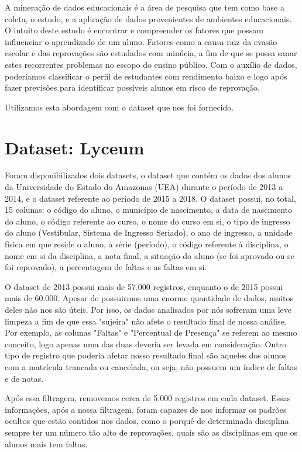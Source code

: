 \documentclass[12pt]{article}
\begin{document}
A mineração de dados educacionais é a área de pesquisa que tem como base a coleta, o estudo, e a aplicação de dados provenientes de ambientes educacionais. \cite{Minera:01}\cite{Lucas:17} O intuito deste estudo é encontrar e compreender os fatores que possam influenciar o aprendizado de um aluno. Fatores como a causa-raiz da evasão escolar e das reprovações são estudados com minúcia, a fim de que se possa sanar estes recorrentes problemas no escopo do ensino público. Com o auxílio de dados, poderíamos classificar o perfil de estudantes com rendimento baixo e logo após fazer previsões para identificar possíveis alunos em risco de reprovação.

Utilizamos esta abordagem com o dataset que nos foi fornecido.

\section{Dataset: Lyceum}
Foram disponibilizados dois datasets, o dataset que contém os dados dos alunos da Universidade do Estado do Amazonas (UEA) durante o período de 2013 a 2014, e o dataset referente ao período de 2015 a 2018. O dataset possui, no total, 15 colunas: o código do aluno, o município de nascimento, a data de nascimento do aluno, o código referente ao curso, o nome do curso em si, o tipo de ingresso do aluno (Vestibular, Sistema de Ingresso Seriado), o ano de ingresso, a unidade física em que reside o aluno, a série (período), o código referente à disciplina, o nome em si da disciplina, a nota final, a situação do aluno (se foi aprovado ou se foi reprovado), a percentagem de faltas e as faltas em si.

O dataset de 2013 possui mais de 57.000 registros, enquanto o de 2015 possui mais de 60.000. Apesar de possuirmos uma enorme quantidade de dados, muitos deles não nos são úteis. Por isso, os dados analisados por nós sofreram uma leve limpeza a fim de que essa "sujeira" não afete o resultado final de nossa análise. Por exemplo, as colunas "Faltas" e "Percentual de Presença" se referem ao mesmo conceito, logo apenas uma das duas deveria ser levada em consideração. Outro tipo de registro que poderia afetar nosso resultado final são aqueles dos alunos com a matrícula trancada ou cancelada, ou seja, não possuem um índice de faltas e de notas. 

Após essa filtragem, removemos cerca de 5.000 registros em cada dataset. Essas informações, após a nossa filtragem, foram capazes de nos informar os padrões ocultos que estão contidos nos dados, como o porquê de determinada disciplina sempre ter um número tão alto de reprovações, quais são as disciplinas em que os alunos mais tem faltas.
\end{document}
